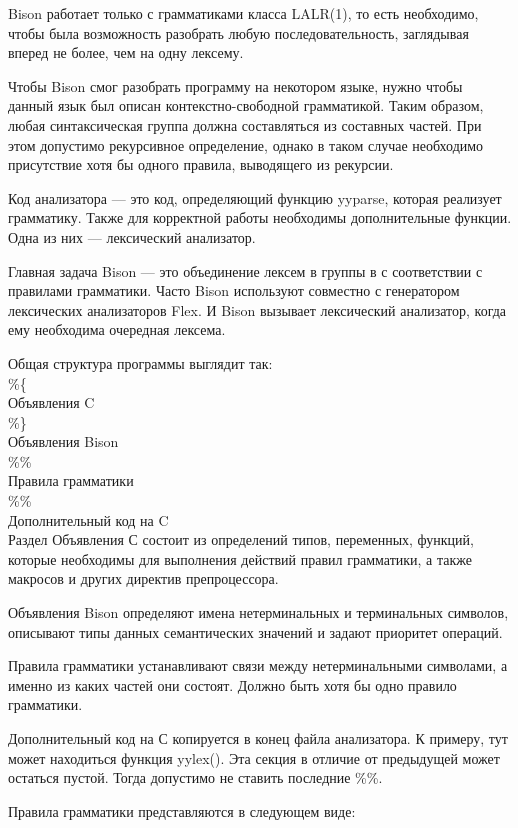 \documentclass[bachelor, och, coursework, times]{SCWorks}
\begin{document}
Bison работает только с грамматиками класса LALR(1), то есть необходимо, чтобы была возможность разобрать любую последовательность, заглядывая вперед не более, чем на одну лексему.

Чтобы Bison смог разобрать программу на некотором языке, нужно чтобы данный язык был описан контекстно-свободной грамматикой. Таким образом, любая синтаксическая группа должна составляться из составных частей. При этом допустимо рекурсивное определение, однако в таком случае необходимо присутствие хотя бы одного правила, выводящего из рекурсии.

Код анализатора --- это код, определяющий функцию yyparse, которая реализует грамматику. Также для корректной работы необходимы дополнительные функции. Одна из них --- лексический анализатор.

Главная задача Bison --- это объединение лексем в группы в с соответствии с правилами грамматики. Часто Bison используют совместно с генератором лексических анализаторов Flex. И Bison вызывает лексический анализатор, когда ему необходима очередная лексема.

Общая структура программы выглядит так: \\
\%\{ \\
Объявления C \\
\%\} \\
Объявления Bison \\
\%\% \\
Правила грамматики \\
\%\% \\
Дополнительный код на C \\

Раздел Объявления С состоит из определений типов, переменных, функций, которые необходимы для выполнения действий правил грамматики, а также макросов и других директив препроцессора.

Объявления Bison определяют имена нетерминальных и терминальных символов, описывают типы данных семантических значений и задают приоритет операций.

Правила грамматики устанавливают связи между нетерминальными символами, а именно из каких частей они состоят. Должно быть хотя бы одно правило грамматики.

Дополнительный код на С копируется в конец файла анализатора. К примеру, тут может находиться функция yylex(). Эта секция в отличие от предыдущей может остаться пустой. Тогда допустимо не ставить последние \%\%.

Правила грамматики представляются в следующем виде:
\end{document}
